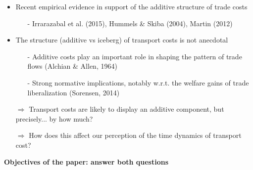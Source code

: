 \documentclass[10 pt,Helvetica, french]{beamer}
\begin{document}
\begin{frame}
\begin{itemize}
\item Recent empirical evidence in support of the additive structure of trade costs \vspace{0.1cm}
\begin{itemize}
\item[-] Irrarazabal et al. (2015), Hummels \& Skiba (2004), Martin (2012)  \vspace{0.2cm}
\end{itemize}
\pause
\item The structure (additive vs iceberg) of transport costs is not anecdotal \vspace{0.1cm}
\begin{itemize}
\item[-] Additive costs play an important role in shaping the pattern of trade flows (Alchian \& Allen, 1964) \vspace{0.1cm}
\item[-] Strong normative implications, notably w.r.t. the welfare gains of trade liberalization (Sorensen, 2014)\vspace{0.1cm}
\pause
\end{itemize}
\item[$\Rightarrow$] Transport costs are likely to display an additive component, but precisely... by how much? \vspace{0.2cm}
\item[$\Rightarrow$] How does this affect our perception of the time dynamics of transport cost?
\end{itemize}
\textbf{Objectives of the paper: answer both questions}

\end{frame}
\end{document}
